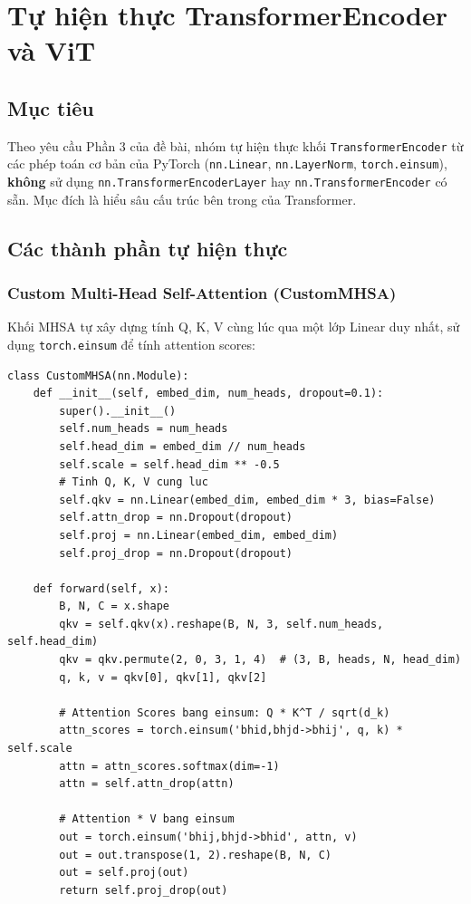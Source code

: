 \documentclass[a4paper]{article}
\newcommand{\code}[1]{\texttt{\textcolor{blue!80!black}{#1}}}
\theoremstyle{definition}
\begin{document}
\section{Tự hiện thực TransformerEncoder và ViT}

\subsection{Mục tiêu}
Theo yêu cầu Phần 3 của đề bài, nhóm tự hiện thực khối \code{TransformerEncoder} từ các phép toán cơ bản của PyTorch (\code{nn.Linear}, \code{nn.LayerNorm}, \code{torch.einsum}), \textbf{không} sử dụng \code{nn.TransformerEncoderLayer} hay \code{nn.TransformerEncoder} có sẵn. Mục đích là hiểu sâu cấu trúc bên trong của Transformer.

\subsection{Các thành phần tự hiện thực}

\subsubsection{Custom Multi-Head Self-Attention (CustomMHSA)}
Khối MHSA tự xây dựng tính Q, K, V cùng lúc qua một lớp Linear duy nhất, sử dụng \code{torch.einsum} để tính attention scores:

\begin{verbatim}
class CustomMHSA(nn.Module):
    def __init__(self, embed_dim, num_heads, dropout=0.1):
        super().__init__()
        self.num_heads = num_heads
        self.head_dim = embed_dim // num_heads
        self.scale = self.head_dim ** -0.5
        # Tinh Q, K, V cung luc
        self.qkv = nn.Linear(embed_dim, embed_dim * 3, bias=False)
        self.attn_drop = nn.Dropout(dropout)
        self.proj = nn.Linear(embed_dim, embed_dim)
        self.proj_drop = nn.Dropout(dropout)

    def forward(self, x):
        B, N, C = x.shape
        qkv = self.qkv(x).reshape(B, N, 3, self.num_heads, self.head_dim)
        qkv = qkv.permute(2, 0, 3, 1, 4)  # (3, B, heads, N, head_dim)
        q, k, v = qkv[0], qkv[1], qkv[2]

        # Attention Scores bang einsum: Q * K^T / sqrt(d_k)
        attn_scores = torch.einsum('bhid,bhjd->bhij', q, k) * self.scale
        attn = attn_scores.softmax(dim=-1)
        attn = self.attn_drop(attn)

        # Attention * V bang einsum
        out = torch.einsum('bhij,bhjd->bhid', attn, v)
        out = out.transpose(1, 2).reshape(B, N, C)
        out = self.proj(out)
        return self.proj_drop(out)
\end{verbatim}
\end{document}
